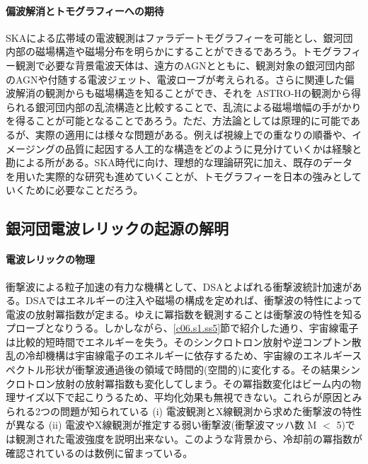 \paragraph{偏波解消とトモグラフィーへの期待}

SKAによる広帯域の電波観測はファラデートモグラフィーを可能とし、銀河団内部の磁場構造や磁場分布を明らかにすることができるであろう。トモグラフィー観測で必要な背景電波天体は、遠方のAGNとともに、観測対象の銀河団内部のAGNや付随する電波ジェット、電波ローブが考えられる。さらに関連した偏波解消の観測からも磁場構造を知ることができ、それを ASTRO-Hの観測から得られる銀河団内部の乱流構造と比較することで、乱流による磁場増幅の手がかりを得ることが可能となることであろう。ただ、方法論としては原理的に可能であるが、実際の適用には様々な問題がある。例えば視線上での重なりの順番や、イメージングの品質に起因する人工的な構造をどのように見分けていくかは経験と勘による所がある\citep{2011A&A...526A...9B}。SKA時代に向け、理想的な理論研究に加え、既存のデータを用いた実際的な研究も進めていくことが、トモグラフィーを日本の強みとしていくために必要なことだろう。

\subsection{銀河団電波レリックの起源の解明}
\label{c06.s3.ss8}

\paragraph{電波レリックの物理}

衝撃波による粒子加速の有力な機構として、DSAとよばれる衝撃波統計加速\citep{1978ApJ...221L..29B, 1987PhR...154....1B}がある。DSAではエネルギーの注入や磁場の構成を定めれば、衝撃波の特性によって電波の放射冪指数が定まる。ゆえに冪指数を観測することは衝撃波の特性を知るプローブとなりうる。しかしながら、\ref{c06.s1.ss5}節で紹介した通り、宇宙線電子は比較的短時間でエネルギーを失う。そのシンクロトロン放射や逆コンプトン散乱の冷却機構は宇宙線電子のエネルギーに依存するため、宇宙線のエネルギースペクトル形状が衝撃波通過後の領域で時間的(空間的)に変化する。その結果シンクロトロン放射の放射冪指数も変化してしまう。その冪指数変化はビーム内の物理サイズ以下で起こりうるため、平均化効果も無視できない。これらが原因とみられる2つの問題が知られている (i) 電波観測とX線観測から求めた衝撃波の特性が異なる (ii) 電波やX線観測が推定する弱い衝撃波(衝撃波マッハ数 M $<$ 5)では観測された電波強度を説明出来ない。このような背景から、冷却前の冪指数が確認されているのは数例に留まっている\citep{2010Sci...330..347V}。


